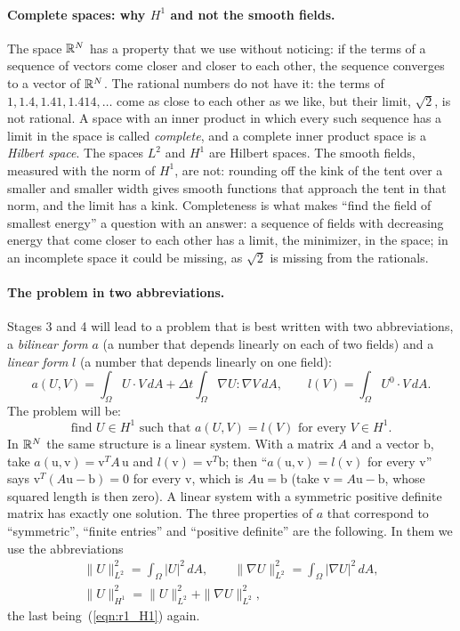 \paragraph{Complete spaces: why $H^1$ and not the smooth fields.} The space $\mathbb{R}^N$ has a property that we use without noticing: if the terms of a sequence of vectors come closer and closer to each other, the sequence converges to a vector of $\mathbb{R}^N$. The rational numbers do not have it: the terms of $1, 1.4, 1.41, 1.414, \ldots$ come as close to each other as we like, but their limit, $\sqrt 2$, is not rational. A space with an inner product in which every such sequence has a limit in the space is called \emph{complete}, and a complete inner product space is a \emph{Hilbert space}. The spaces $L^2$ and $H^1$ are Hilbert spaces. The smooth fields, measured with the norm of $H^1$, are not: rounding off the kink of the tent over a smaller and smaller width gives smooth functions that approach the tent in that norm, and the limit has a kink. Completeness is what makes ``find the field of smallest energy'' a question with an answer: a sequence of fields with decreasing energy that come closer to each other has a limit, the minimizer, in the space; in an incomplete space it could be missing, as $\sqrt 2$ is missing from the rationals.

\paragraph{The problem in two abbreviations.} Stages 3 and 4 will lead to a problem that is best written with two abbreviations, a \emph{bilinear form} $a$ (a number that depends linearly on each of two fields) and a \emph{linear form} $l$ (a number that depends linearly on one field):
\begin{equation}
\label{eqn:r1_forms}
a(U, V) = \int_\Omega U\cdot V\, dA + \Delta t \int_\Omega \nabla U : \nabla V\, dA, \qquad l(V) = \int_\Omega U^0\cdot V\, dA .
\end{equation}
The problem will be:
\begin{equation}
\label{eqn:r1_abstract}
\text{find } U \in H^1 \text{ such that } a(U, V) = l(V) \text{ for every } V \in H^1 .
\end{equation}
In $\mathbb{R}^N$ the same structure is a linear system. With a matrix $A$ and a vector $\mathrm b$, take $a(\mathrm u, \mathrm v) = \mathrm v^T A\, \mathrm u$ and $l(\mathrm v) = \mathrm v^T\mathrm b$; then ``$a(\mathrm u, \mathrm v) = l(\mathrm v)$ for every $\mathrm v$'' says $\mathrm v^T(A\mathrm u - \mathrm b) = 0$ for every $\mathrm v$, which is $A\mathrm u = \mathrm b$ (take $\mathrm v = A\mathrm u - \mathrm b$, whose squared length is then zero). A linear system with a symmetric positive definite matrix has exactly one solution. The three properties of $a$ that correspond to ``symmetric'', ``finite entries'' and ``positive definite'' are the following. In them we use the abbreviations
\begin{gather*}
\|U\|_{L^2}^2 = \int_\Omega |U|^2\, dA, \qquad \|\nabla U\|_{L^2}^2 = \int_\Omega |\nabla U|^2\, dA, \\
\|U\|_{H^1}^2 = \|U\|_{L^2}^2 + \|\nabla U\|_{L^2}^2 ,
\end{gather*}
the last being~(\ref{eqn:r1_H1}) again.

